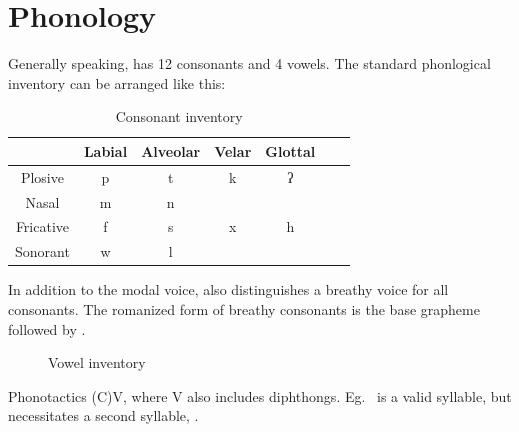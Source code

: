 \chapter{Phonology}

Generally speaking, \langname{} has 12 consonants and 4 vowels. The standard phonlogical inventory can be arranged like this:

\begin{table}[ht]


    \centering
    \begin{tabular}{*{7}{c}}
        \toprule
                  & Labial & Alveolar & Velar & Glottal         \\\midrule
        Plosive   & p      & t        & k     & ʔ \orthotext{'} \\
        Nasal     & m      & n        &       &                 \\
        Fricative & f      & s        & x     & h               \\
        Sonorant  & w      & l        &       &                 \\
        \bottomrule
    \end{tabular}
    \caption{Consonant inventory}
\end{table}

In addition to the modal voice, \langname{} also distinguishes a breathy voice for all consonants. The romanized form of breathy consonants is the base grapheme followed by .

\begin{figure}[htbp]
    \centering
    \begin{vowel}
    \end{vowel}
    \caption{Vowel inventory}
\end{figure}

Phonotactics (C)V, where V also includes diphthongs. Eg.\  is a valid syllable, but  necessitates a second syllable, .